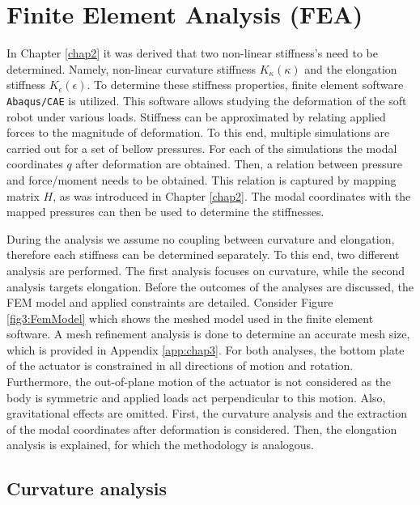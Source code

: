 
\section{Finite Element Analysis (FEA)}


In Chapter \ref{chap2} it was derived that two non-linear stiffness's need to be determined. Namely, non-linear curvature stiffness $K_\kappa(\kappa)$ and the elongation stiffness $K_\epsilon(\epsilon)$. To determine these stiffness properties, finite element software \verb+Abaqus/CAE+ is utilized. This software allows studying the deformation of the soft robot under various loads. Stiffness can be approximated by relating applied forces to the magnitude of deformation. To this end, multiple simulations are carried out for a set of bellow pressures. For each of the simulations the modal coordinates $q$ after deformation are obtained. Then, a relation between pressure and force/moment needs to be obtained. This relation is captured by mapping matrix $H$, as was introduced in Chapter \ref{chap2}. The modal coordinates with the mapped pressures can then be used to determine the stiffnesses.

During the analysis we assume no coupling between curvature and elongation, therefore each stiffness can be determined separately. To this end, two different analysis are performed. The first analysis focuses on curvature, while the second analysis targets elongation. Before the outcomes of the analyses are discussed, the FEM model and applied constraints are detailed. Consider Figure \ref{fig3:FemModel} which shows the meshed model used in the finite element software. A mesh refinement analysis is done to determine an accurate mesh size, which is provided in Appendix \ref{app:chap3}. For both analyses, the bottom plate of the actuator is constrained in all directions of motion and rotation. Furthermore, the out-of-plane motion of the actuator is not considered as the body is symmetric and applied loads act perpendicular to this motion. Also, gravitational effects are omitted. First, the curvature analysis and the extraction of the modal coordinates after deformation is considered. Then, the elongation analysis is explained, for which the methodology is analogous. 


\subsection{Curvature analysis}

